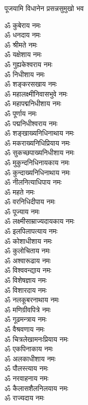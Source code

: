 {पूजयामि विधानेन प्रसन्नसुमुखो भव}
\begin{multicols}{2}
\begin{flushleft}
ॐ कुबेराय नमः\\
ॐ धनदाय नमः\\
ॐ श्रीमते नमः\\
ॐ यक्षेशाय नमः\\
ॐ गुह्यकेश्वराय नमः\\
ॐ निधीशाय नमः\\
ॐ शङ्करसखाय नमः\\
ॐ महालक्ष्मीनिवासभुवे नमः\\
ॐ महापद्मनिधीशाय नमः\\
ॐ पूर्णाय नमः\hfill{}\\ %
ॐ पद्मनिधीश्वराय नमः\\
ॐ शङ्खाख्यनिधिनाथाय नमः\\
ॐ मकराख्यनिधिप्रियाय नमः\\
ॐ सुकच्छपाख्यनिधीशाय नमः\\
ॐ मुकुन्दनिधिनायकाय नमः\\
ॐ कुन्दाख्यनिधिनाथाय नमः\\
ॐ नीलनित्याधिपाय नमः\\
ॐ महते नमः\\
ॐ वरनिधिदीपाय नमः\\
ॐ पूज्याय नमः\hfill{}\\ %
ॐ लक्ष्मीसाम्राज्यदायकाय नमः\\
ॐ इलपिलापत्याय नमः\\
ॐ कोशाधीशाय नमः\\
ॐ कुलोचिताय नमः\\
ॐ अश्वारूढाय नमः\\
ॐ विश्ववन्द्याय नमः\\
ॐ विशेषज्ञाय नमः\\
ॐ विशारदाय नमः\\
ॐ नलकूबरनाथाय नमः\\
ॐ मणिग्रीवपित्रे नमः\hfill{}\\ %
ॐ गूढमन्त्राय नमः\\
ॐ वैश्रवणाय नमः\\
ॐ चित्रलेखामनःप्रियाय नमः\\
ॐ एकपिनाकाय नमः\\
ॐ अलकाधीशाय नमः\\
ॐ पौलस्त्याय नमः\\
ॐ नरवाहनाय नमः\\
ॐ कैलासशैलनिलयाय नमः\\
ॐ राज्यदाय नमः\\

\end{flushleft}
\end{multicols}

